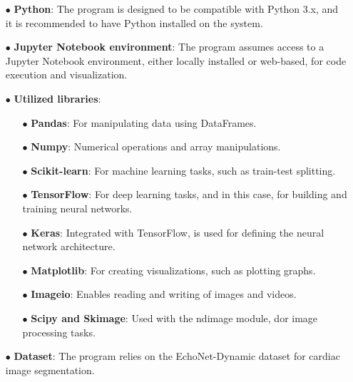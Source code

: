 \documentclass[runningheads]{llncs}
\begin{document}
\begin{itemize}
    \item[$\bullet$] \textbf{Python}:  The program is designed to be compatible with Python 3.x, and it is recommended to have Python installed on the system.
    \item[$\bullet$] \textbf{Jupyter Notebook environment}: The program assumes access to a Jupyter Notebook environment, either locally installed or web-based, for code execution and visualization.
    \item[$\bullet$] \textbf{Utilized libraries}:
        \begin{itemize}
            \item[$\bullet$] \textbf{Pandas}: For manipulating data using DataFrames.
            \item[$\bullet$] \textbf{Numpy}: Numerical operations and array manipulations.
            \item[$\bullet$] \textbf{Scikit-learn}: For machine learning tasks, such as train-test splitting.
            \item[$\bullet$] \textbf{TensorFlow}: For deep learning tasks, and in this case, for building and training neural networks.
            \item[$\bullet$] \textbf{Keras}: Integrated with TensorFlow, is used for defining the neural network architecture.
            \item[$\bullet$] \textbf{Matplotlib}: For creating visualizations, such as plotting graphs.
            \item[$\bullet$] \textbf{Imageio}: Enables reading and writing of images and videos.
            \item[$\bullet$] \textbf{Scipy and Skimage}: Used with the ndimage module, dor image processing tasks.
        \end{itemize}
    \item[$\bullet$] \textbf{Dataset}: The program relies on the EchoNet-Dynamic dataset for cardiac image segmentation.
\end{itemize}
\end{document}
